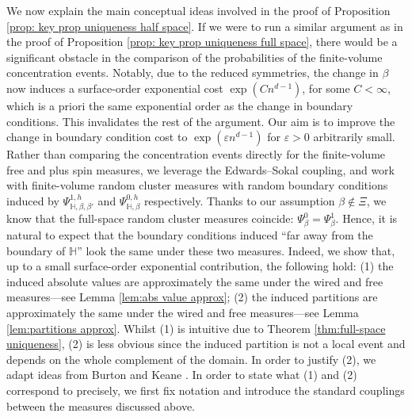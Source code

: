 \documentclass[11pt,a4paper]{article}
\numberwithin{equation}{section}
\theoremstyle{plain}
\theoremstyle{definition}
\begin{document}
We now explain the main conceptual ideas involved in the proof of Proposition \ref{prop: key prop uniqueness half space}. If we were to run a similar argument as in the proof of Proposition \ref{prop: key prop uniqueness full space}, there would be a significant obstacle in the comparison of the probabilities of the finite-volume concentration events. Notably, due to the reduced symmetries, the change in $\beta$ now induces a surface-order exponential cost $\exp(Cn^{d-1})$, for some $C<\infty$, which is a priori the same exponential order as the change in boundary conditions. This invalidates the rest of the argument. Our aim is to improve the change in boundary condition cost to $\exp(\varepsilon n^{d-1})$ for $\varepsilon>0$ arbitrarily small. Rather than comparing the concentration events directly for the finite-volume free and plus spin measures, we leverage the Edwards--Sokal coupling, and work with finite-volume random cluster measures with random boundary conditions induced by $\Psi^{1,h}_{\mathbb H,\beta,\beta'}$ and $\Psi^{0,h}_{\mathbb H,\beta}$ respectively. Thanks to our assumption $\beta \not\in\Xi$, we know that the full-space random cluster measures coincide: $\Psi^0_\beta = \Psi^1_\beta$. Hence, it is natural to expect that the boundary conditions induced ``far away from the boundary of $\mathbb H$'' look the same under these two measures. Indeed, we show that, up to a small surface-order exponential contribution, the following hold: (1) the induced absolute values are approximately the same under the wired and free measures---see Lemma \ref{lem:abs value approx}; (2) the induced partitions are approximately the same under the wired and free measures---see Lemma \ref{lem:partitions approx}. Whilst (1) is intuitive due to Theorem \ref{thm:full-space uniqueness}, (2) is less obvious since the induced partition is not a local event and depends on the whole complement of the domain. In order to justify (2), we adapt ideas from Burton and Keane \cite{BurtonKeane1989density}. In order to state what (1) and (2) correspond to precisely, we first fix notation and introduce the standard couplings between the measures discussed above. 


\vspace{5pt}
\end{document}
